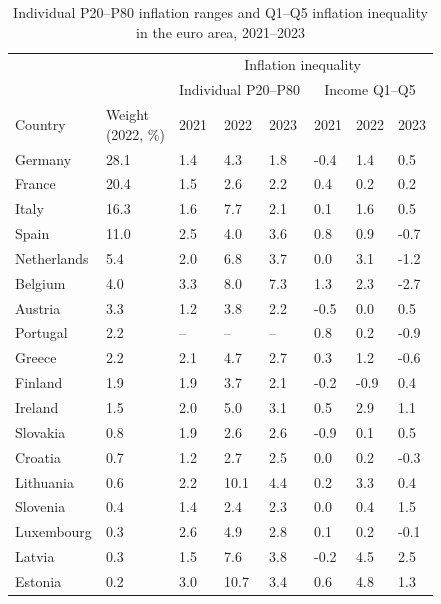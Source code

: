 \begin{table}[H]
\small
\setlength{\tabcolsep}{5pt}
\renewcommand{\arraystretch}{0.95}

\caption{\label{tab:country-heterogeneity-cumulative-gap}Individual P20--P80 inflation ranges and Q1--Q5 inflation inequality in the euro area, 2021--2023}
\centering
\begin{tabular}[t]{llllllll}
\toprule
\multicolumn{2}{c}{} & \multicolumn{6}{c}{Inflation inequality}\\
\cmidrule(lr){3-8}
\multicolumn{2}{c}{} & \multicolumn{3}{c}{Individual P20--P80} & \multicolumn{3}{c}{Income Q1--Q5}\\
\cmidrule(lr){3-5} \cmidrule(lr){6-8}
Country & \shortstack{Weight\\(2022, \%)} & 2021 & 2022 & 2023 & 2021 & 2022 & 2023\\
\midrule
Germany & 28.1 & 1.4 & 4.3 & 1.8 & -0.4 & 1.4 & 0.5\\
France & 20.4 & 1.5 & 2.6 & 2.2 & 0.4 & 0.2 & 0.2\\
Italy & 16.3 & 1.6 & 7.7 & 2.1 & 0.1 & 1.6 & 0.5\\
Spain & 11.0 & 2.5 & 4.0 & 3.6 & 0.8 & 0.9 & -0.7\\
Netherlands & 5.4 & 2.0 & 6.8 & 3.7 & 0.0 & 3.1 & -1.2\\
\addlinespace
Belgium & 4.0 & 3.3 & 8.0 & 7.3 & 1.3 & 2.3 & -2.7\\
Austria & 3.3 & 1.2 & 3.8 & 2.2 & -0.5 & 0.0 & 0.5\\
Portugal & 2.2 & -- & -- & -- & 0.8 & 0.2 & -0.9\\
Greece & 2.2 & 2.1 & 4.7 & 2.7 & 0.3 & 1.2 & -0.6\\
Finland & 1.9 & 1.9 & 3.7 & 2.1 & -0.2 & -0.9 & 0.4\\
\addlinespace
Ireland & 1.5 & 2.0 & 5.0 & 3.1 & 0.5 & 2.9 & 1.1\\
Slovakia & 0.8 & 1.9 & 2.6 & 2.6 & -0.9 & 0.1 & 0.5\\
Croatia & 0.7 & 1.2 & 2.7 & 2.5 & 0.0 & 0.2 & -0.3\\
Lithuania & 0.6 & 2.2 & 10.1 & 4.4 & 0.2 & 3.3 & 0.4\\
Slovenia & 0.4 & 1.4 & 2.4 & 2.3 & 0.0 & 0.4 & 1.5\\
\addlinespace
Luxembourg & 0.3 & 2.6 & 4.9 & 2.8 & 0.1 & 0.2 & -0.1\\
Latvia & 0.3 & 1.5 & 7.6 & 3.8 & -0.2 & 4.5 & 2.5\\
Estonia & 0.2 & 3.0 & 10.7 & 3.4 & 0.6 & 4.8 & 1.3\\

\end{tabular}
\end{table}
